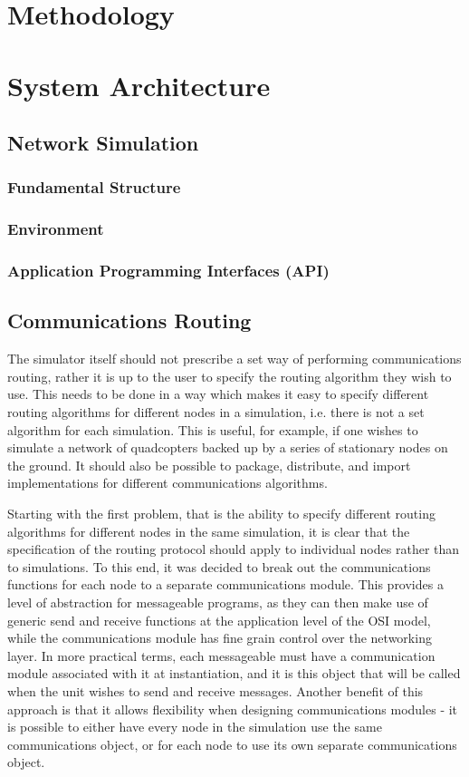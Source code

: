 \section{Methodology}
\section{System Architecture}
	\subsection{Network Simulation}
		\subsubsection{Fundamental Structure}
		\subsubsection{Environment}
		\subsubsection{Application Programming Interfaces (API)}
	\subsection{Communications Routing}

The simulator itself should not prescribe a set way of performing communications routing, rather it is up to the user to specify the routing algorithm they wish to use. This needs to be done in a way which makes it easy to specify different routing algorithms for different nodes in a simulation, i.e. there is not a set algorithm for each simulation. This is useful, for example, if one wishes to simulate a network of quadcopters backed up by a series of stationary nodes on the ground. It should also be possible to package, distribute, and import implementations for different communications algorithms.

Starting with the first problem, that is the ability to specify different routing algorithms for different nodes in the same simulation, it is clear that the specification of the routing protocol should apply to individual nodes rather than to simulations. To this end, it was decided to break out the communications functions for each node to a separate communications module. This provides a level of abstraction for messageable programs, as they can then make use of generic send and receive functions at the application level of the OSI model, while the communications module has fine grain control over the networking layer. In more practical terms, each messageable must have a communication module associated with it at instantiation, and it is this object that will be called when the unit wishes to send and receive messages. Another benefit of this approach is that it allows flexibility when designing communications modules - it is possible to either have every node in the simulation use the same communications object, or for each node to use its own separate communications object.

